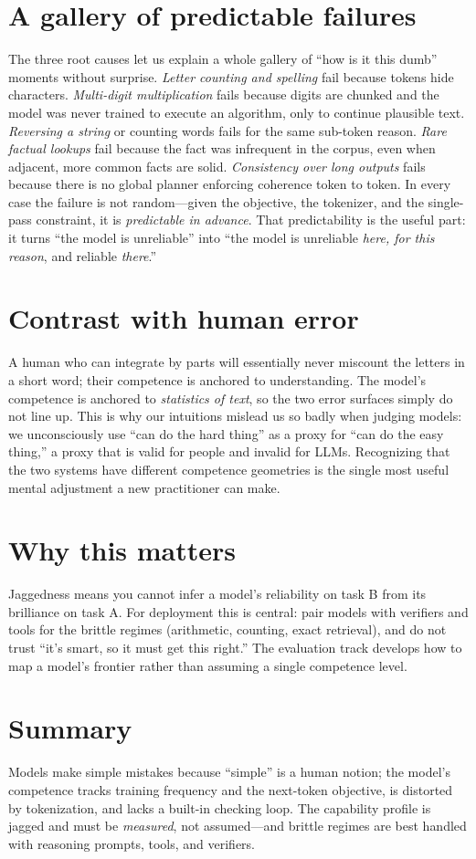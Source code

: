 \documentclass[11pt]{article}
\begin{document}
\section{A gallery of predictable failures}
The three root causes let us explain a whole gallery of ``how is it this dumb'' moments without surprise.
\emph{Letter counting and spelling} fail because tokens hide characters. \emph{Multi-digit multiplication}
fails because digits are chunked and the model was never trained to execute an algorithm, only to continue
plausible text. \emph{Reversing a string} or counting words fails for the same sub-token reason.
\emph{Rare factual lookups} fail because the fact was infrequent in the corpus, even when adjacent, more
common facts are solid. \emph{Consistency over long outputs} fails because there is no global planner
enforcing coherence token to token. In every case the failure is not random---given the objective, the
tokenizer, and the single-pass constraint, it is \emph{predictable in advance}. That predictability is the
useful part: it turns ``the model is unreliable'' into ``the model is unreliable \emph{here, for this
reason}, and reliable \emph{there}.''

\section{Contrast with human error}
A human who can integrate by parts will essentially never miscount the letters in a short word; their
competence is anchored to understanding. The model's competence is anchored to \emph{statistics of text},
so the two error surfaces simply do not line up. This is why our intuitions mislead us so badly when
judging models: we unconsciously use ``can do the hard thing'' as a proxy for ``can do the easy thing,''
a proxy that is valid for people and invalid for LLMs. Recognizing that the two systems have different
competence geometries is the single most useful mental adjustment a new practitioner can make.

\section{Why this matters}
Jaggedness means you cannot infer a model's reliability on task B from its brilliance on task A. For
deployment this is central: pair models with verifiers and tools for the brittle regimes (arithmetic,
counting, exact retrieval), and do not trust ``it's smart, so it must get this right.'' The evaluation
track develops how to map a model's frontier rather than assuming a single competence level.

\section{Summary}
Models make simple mistakes because ``simple'' is a human notion; the model's competence tracks training
frequency and the next-token objective, is distorted by tokenization, and lacks a built-in checking loop.
The capability profile is jagged and must be \emph{measured}, not assumed---and brittle regimes are best
handled with reasoning prompts, tools, and verifiers.



\end{document}
